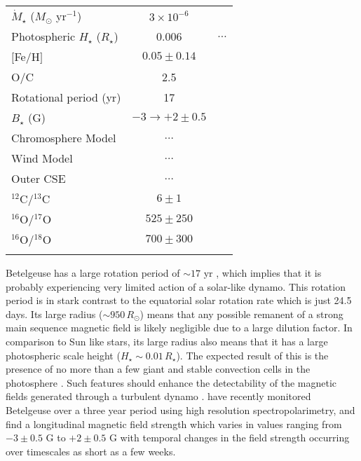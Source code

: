 \begin{table}[!hbt]
\begin{center}
\begin{tabular}{lcc}
$\dot{M}_{\star}$ ($M_{\odot}$ yr$^{-1}$)& $3\times 10^{-6}$ &\cite{harper_2001} \\
Photospheric $H_{\star}$ ($R_{\star}$)& 0.006 & $\dots$\\
$[$Fe/H$]$& $0.05 \pm 0.14$ & \cite{ramirez_2000}\\
O/C& 2.5 & \cite{lambert_1984}\\
Rotational period (yr) & 17 & \cite{uitenbroek_1998}\\
$B_{\star}$ (G) & $-3 \rightarrow +2 \pm 0.5$ & \cite{bedecarrax_2013} \\
Chromosphere Model & $\ldots$ & \cite{harper_2001} \\
Wind Model &  $\ldots$ &\cite{harper_2001}\\ 
Outer CSE &  $\ldots$ &\cite{rodgers_1991}\\ 
$^{12}$C/$^{13}$C & $6\pm 1$ &\cite{harris_1984}\\ 
$^{16}$O/$^{17}$O & $525\pm 250$ &\cite{harris_1984}\\ 
$^{16}$O/$^{18}$O & $700\pm 300$ &\cite{harris_1984}\\ 
\hline
\rule{0pt}{2.0ex}
\end{tabular}
\label{tab:3.1}
\end{center}
\end{table}

Betelgeuse has a large rotation period of $\sim 17$ yr \citep{uitenbroek_1998}, which implies that it is probably experiencing very limited action of a solar-like dynamo. This rotation period is in stark contrast to the equatorial solar rotation rate which is just 24.5 days. Its large radius ($\sim 950\,R_{\odot}$) means that any possible remanent of a strong main sequence magnetic field is likely negligible due to a large dilution factor. In comparison to Sun like stars, its large radius also means that it has a large photospheric scale height ($H_{\star} \sim 0.01\,R_{\star}$). The expected result of this is the presence of no more than a few giant and stable convection cells in the photosphere \cite{schwarzschild_1975}. Such features should enhance the detectability of the magnetic fields generated through a turbulent dynamo \citep{vogler_2007}. \cite{bedecarrax_2013} have recently monitored Betelgeuse over a three year period using high resolution spectropolarimetry, and find a longitudinal magnetic field strength which varies  in values ranging from $-3 \pm 0.5$ G to $+2 \pm 0.5$ G with temporal changes in the field strength occurring over timescales as short as a few weeks.

